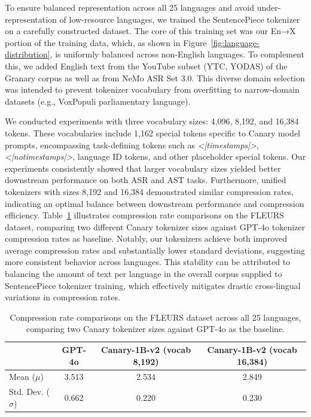 To ensure balanced representation across all 25 languages and avoid under-representation of low-resource languages, we trained the SentencePiece tokenizer \cite{sentencepiece} on a carefully constructed dataset. The core of this training set was our En→X portion of the training data, which, as shown in Figure~\ref{fig:language-distribution}, is uniformly balanced across non-English languages. To complement this, we added English text from the YouTube subset (YTC, YODAS) of the Granary corpus as well as from NeMo ASR Set 3.0. This diverse domain selection was intended to prevent tokenizer vocabulary from overfitting to narrow-domain datasets (e.g., VoxPopuli parliamentary language).

We conducted experiments with three vocabulary sizes: 4,096, 8,192, and 16,384 tokens. These vocabularies include 1,162 special tokens specific to Canary model prompts, encompassing task-defining tokens such as \emph{<|timestamps|>}, \emph{<|notimestamps|>}, language ID tokens, and other placeholder special tokens. Our experiments consistently showed that larger vocabulary sizes yielded better downstream performance on both ASR and AST tasks. Furthermore, unified tokenizers with sizes 8,192 and 16,384 demonstrated similar compression rates, indicating an optimal balance between downstream performance and compression efficiency. Table~\ref{tab:fleurs-compression} illustrates compression rate comparisons on the FLEURS dataset, comparing two different Canary tokenizer sizes against GPT-4o\cite{openai2024gpt4ocard} tokenizer compression rates as baseline. Notably, our tokenizers achieve both improved average compression rates and substantially lower standard deviations, suggesting more consistent behavior across languages. This stability can be attributed to balancing the amount of text per language in the overall corpus supplied to SentencePiece tokenizer training, which effectively mitigates drastic cross-lingual variations in compression rates.

\begin{table}[ht]
  \centering
  \setlength{\abovecaptionskip}{10pt} %
  \begin{tabular}{lccc}
    \toprule
    & GPT-4o & Canary-1B-v2 (vocab 8,192) & Canary-1B-v2 (vocab 16,384) \\
    \midrule
    Mean ($\mu$)      & 3.513 & 2.534 & 2.849 \\
    Std. Dev. ($\sigma$) & 0.662 & 0.220 & 0.230 \\
    \bottomrule
  \end{tabular}
  \caption{Compression rate comparisons on the FLEURS dataset across all 25 languages, comparing two Canary tokenizer sizes against GPT-4o as the baseline.}
  \label{tab:fleurs-compression}
\end{table}

